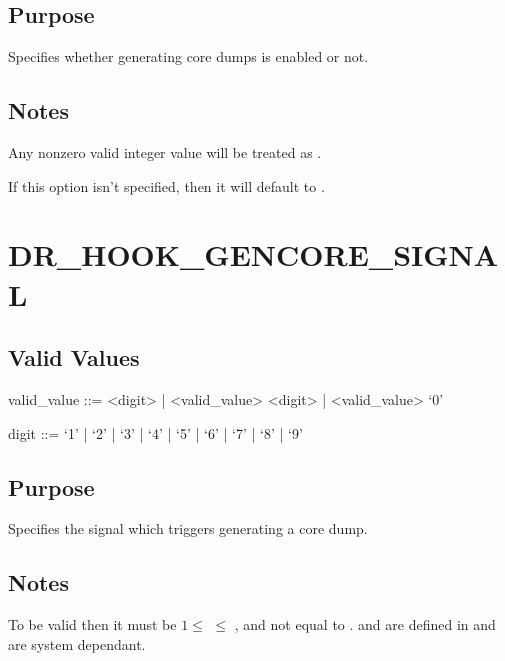 \documentclass[letterpaper,10pt,english]{sphinxmanual}
\begin{document}
\subsection{Purpose}
\label{\detokenize{flag/flag:id217}}
\sphinxAtStartPar
Specifies whether generating core dumps is enabled or not.


\subsection{Notes}
\label{\detokenize{flag/flag:id218}}
\sphinxAtStartPar
Any non\sphinxhyphen{}zero valid integer value will be treated as .

\sphinxAtStartPar
If this option isn’t specified, then it will default to .


\section{DR\_HOOK\_GENCORE\_SIGNAL}
\label{\detokenize{flag/flag:dr-hook-gencore-signal}}\label{\detokenize{flag/flag:id220}}

\subsection{Valid Values}
\label{\detokenize{flag/flag:id221}}
\begin{DUlineblock}{0em}
\item[] valid\_value ::= \textless{}digit\textgreater{} | \textless{}valid\_value\textgreater{} \textless{}digit\textgreater{} | \textless{}valid\_value\textgreater{} ‘0’
\item[] digit ::= ‘1’ | ‘2’ | ‘3’ | ‘4’ | ‘5’ | ‘6’ | ‘7’ | ‘8’ | ‘9’
\end{DUlineblock}


\subsection{Purpose}
\label{\detokenize{flag/flag:id222}}
\sphinxAtStartPar
Specifies the signal which triggers generating a core dump.


\subsection{Notes}
\label{\detokenize{flag/flag:id223}}
\sphinxAtStartPar
To be valid then it must be \(1 \leq\)  \(\leq\) , and not equal to .  and  are defined in  and are system dependant.
\end{document}
